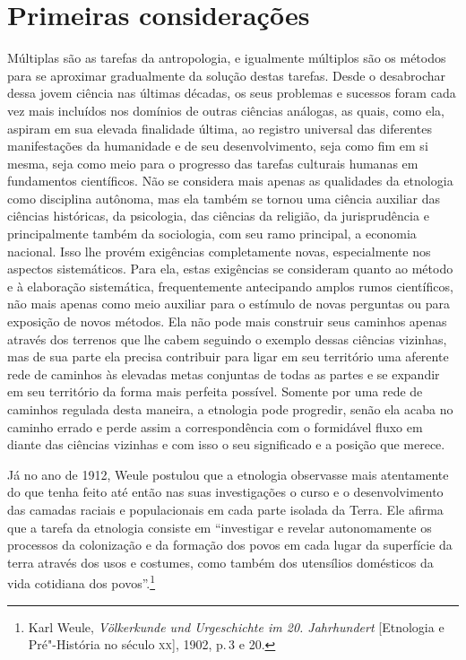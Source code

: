 \chapter*{Primeiras considerações\smallskip{}}

Múltiplas são as tarefas da antropologia, e igualmente múltiplos são os
métodos para se aproximar gradualmente da solução destas tarefas. Desde
o desabrochar dessa jovem ciência nas últimas décadas, os seus problemas
e sucessos foram cada vez mais incluídos nos domínios de outras ciências
análogas, as quais, como ela, aspiram em sua elevada finalidade última,
ao registro universal das diferentes manifestações da humanidade e de
seu desenvolvimento, seja como fim em si mesma, seja como meio para o
progresso das tarefas culturais humanas em fundamentos científicos. Não
se considera mais apenas as qualidades da etnologia como disciplina
autônoma, mas ela também se tornou uma ciência auxiliar das ciências
históricas, da psicologia, das ciências da religião, da jurisprudência
e principalmente também da sociologia, com seu ramo principal, a
economia nacional. Isso lhe provém exigências completamente novas,
especialmente nos aspectos sistemáticos. Para ela, estas exigências se
consideram quanto ao método e à elaboração sistemática, frequentemente
antecipando amplos rumos científicos, não mais apenas como meio
auxiliar para o estímulo de novas perguntas ou para exposição de novos
métodos. Ela não pode mais construir seus caminhos apenas através dos
terrenos que lhe cabem seguindo o exemplo dessas ciências vizinhas, mas
de sua parte ela precisa contribuir para ligar em seu território uma
aferente rede de caminhos às elevadas metas conjuntas de todas as
partes e se expandir em seu território da forma mais perfeita possível.
Somente por uma rede de caminhos regulada desta maneira, a etnologia
pode progredir, senão ela acaba no caminho errado e perde assim a
correspondência com o formidável fluxo em diante das ciências vizinhas e
com isso o seu significado e a posição que merece.

Já no ano de 1912, Weule postulou que a etnologia observasse mais
atentamente do que tenha feito até então nas suas investigações o curso
e o desenvolvimento das camadas raciais e populacionais em cada parte
isolada da Terra. Ele afirma que a tarefa da etnologia consiste em
``investigar e revelar autonomamente os processos da colonização e da
formação dos povos em cada lugar da superfície da terra através dos usos
e costumes, como também dos utensílios domésticos da vida cotidiana dos
povos''.\footnote{Karl Weule, \textit{Völkerkunde und Urgeschichte im 20.
  Jahrhundert} {[}Etnologia e Pré"-História no século \textsc{xx}{]}, 1902, p.\,3 e 20.}

